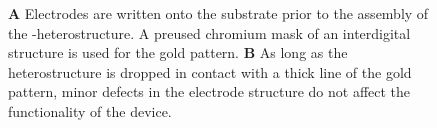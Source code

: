 \begin{figure}
\begin{subfigure}{0.4\textwidth}
\end{subfigure}
\begin{subfigure}{0.4\textwidth}
	\caption{}
\end{subfigure}
\caption{\textbf{A} Electrodes are written onto the substrate prior to the assembly of the \hbn-\tmdg heterostructure. A preused chromium mask of an interdigital structure is used for the gold pattern. \textbf{B} As long as the heterostructure is dropped in contact with a thick line of the gold pattern, minor defects in the electrode structure do not affect the functionality of the device.}
	\label{pattern}
\end{figure}

